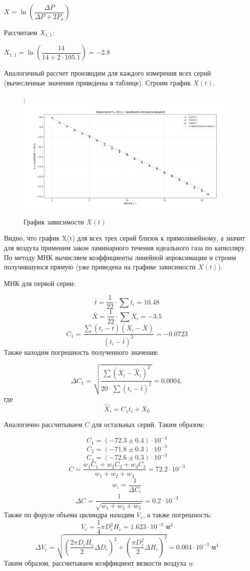 \documentclass[a4paper]{article}
\begin{document}
$X = \ln \left( \dfrac{\Delta P}{\Delta P+2P_a}\right)$

Рассчитаем $X_{1,1}$:

$X_{1,1} = \ln \left(\dfrac{14}{14+2\cdot105.1}\right) = -2.8$

Аналогичный рассчет производим для каждого измерения всех серий (вычесленные значения приведены в таблице). Строим график $X(t)$.

\begin{figure}[H]
    \begin{center}
    ;\includegraphics[width=1.11\textwidth]{graf_1.png}
    \caption{График зависимости $X(t)$}
\end{center}
\end{figure}

Видно, что график X(t) для всех трех серий близок к прямолинейному, а значит для воздуха применим закон ламинарного течения идеального газа по капилляру. По методу МНК вычисляем коэффициенты линейной апроксимации и строим получившуюся прямую (уже приведена на графике зависимости $X(t)$).

МНК для первой серии:

\[
\overline{t} = \dfrac{1}{22}\cdot\sum t_i = 10.48
\]
\[
\overline{X} = \dfrac{1}{22}\cdot\sum X_i = -3.5
\]
\[
C_1 = \dfrac{\sum(t_i-\bar{t})(X_i-\bar{X})}{(t_i-\bar{t})^2} = -0.0723
\]
Также находим погрешность полученного значения:

\[
\Delta C_1= \sqrt{\frac{\sum (X_i - \hat{X}_i)^2 }{20\cdot\sum(t_i - \bar{t})^2}} = 0.0004,
\]
где
\[
\hat X_i = C_1t_i+X_0
\]

Аналогично рассчитываем $C$ для остальных серий. Таким образом:

\[
C_1 = (-72.3\pm0.4)\cdot 10^{-3}
\]
\[
C_2 = (-71.8\pm0.3)\cdot 10^{-3}
\]
\[
C_3 = (-72.6\pm0.3)\cdot 10^{-3}
\]
\[
C = \dfrac{w_1C_1+w_2C_2+w_3C_3}{w_1+w_2+w_3} = 72.2\cdot10^{-3}
\]
\[
w_i = \dfrac{1}{\Delta C_i}
\]
\[
\Delta C = \dfrac{1}{\sqrt{w_1+w_2+w_3}} = 0.2\cdot10^{-3}
\]
Также по форуле объема цилиндра находим $V_c$, а также погрешность:
\[
V_c = \dfrac{1}{4}\pi D_c^2H_c = 1.623\cdot10^{-3} \text{ м$^3$}
\]
\[
\Delta V_c = \sqrt{\left(\dfrac{2\pi D_cH_c}{2}\Delta D_c\right)^2+\left(\dfrac{\pi D_c^2}{2}\Delta H_c\right)^2} = 0.004\cdot10^{-3} \text{ м$^3$}
\]
Таким образом, рассчитываем коэффициент вязкости воздуха $\eta$:
\end{document}
